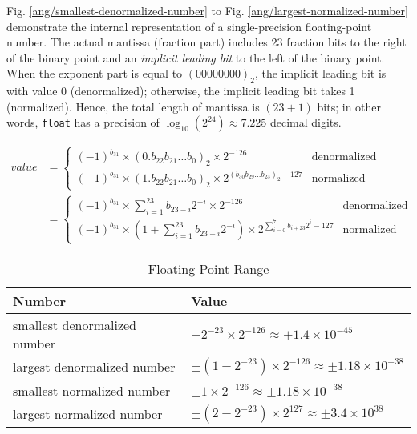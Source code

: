 Fig. \ref{ang/smallest-denormalized-number} to Fig. \ref{ang/largest-normalized-number} demonstrate the internal representation of a single-precision floating-point number. The actual mantissa (fraction part) includes 23 fraction bits to the right of the binary point and an \textit{implicit leading bit} to the left of the binary point. When the exponent part is equal to $(00000000)_2$, the implicit leading bit is with value 0 (denormalized); otherwise, the implicit leading bit takes 1 (normalized). Hence, the total length of mantissa is $(23 + 1)$ bits; in other words, \texttt{float} has a precision of $\log_{10}(2^{24}) \approx 7.225$ decimal digits.

\begin{align}
value &=
\begin{cases}
(-1)^{b_{31}} \times (0.b_{22}b_{21} \dots b_{0})_2 \times 2^{- 126} &\text{denormalized}\\
(-1)^{b_{31}} \times (1.b_{22}b_{21} \dots b_{0})_2 \times 2^{(b_{30}b_{29} \dots b_{23})_2 - 127} &\text{normalized}
\end{cases}\\
&=
\begin{cases}
\displaystyle(-1)^{b_{31}} \times \sum_{i=1}^{23} b_{23-i} 2^{-i} \times 2^{- 126} &\text{denormalized}\\
\displaystyle(-1)^{b_{31}} \times ( 1 + \sum_{i=1}^{23} b_{23-i} 2^{-i} ) \times 2^{\sum_{i=0}^{7} b_{i+23} 2^i - 127} &\text{normalized}
\end{cases}
\end{align}

\begin{table}[H]
\centering
\caption{Floating-Point Range}
\label{floating-point-range}
\begin{tabu} to \textwidth {XX}
\toprule
Number &Value\\
\hline
smallest denormalized number &$\pm 2^{-23} \times 2^{-126} \approx \pm 1.4 \times 10^{-45}$\\
\hline
largest denormalized number &$\pm (1-2^{-23}) \times 2^{-126} \approx \pm 1.18 \times 10^{-38}$\\
\hline
smallest normalized number &$\pm 1 \times 2^{-126} \approx \pm 1.18 \times 10^{-38}$\\
\hline
largest normalized number &$\pm (2-2^{-23}) \times 2^{127} \approx \pm 3.4 \times 10^{38}$\\
\bottomrule
\end{tabu}
\end{table}
